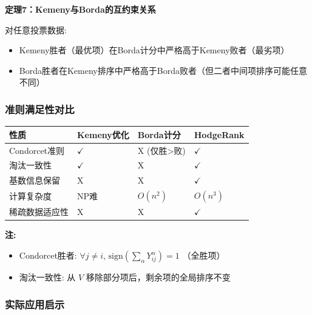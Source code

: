\documentclass[a4paper]{article}
\begin{document}
\textbf{定理7：Kemeny与Borda的互约束关系}

对任意投票数据:
\begin{itemize}
    \item Kemeny胜者（最优项）在Borda计分中严格高于Kemeny败者（最劣项）
    \item Borda胜者在Kemeny排序中严格高于Borda败者（但二者中间项排序可能任意不同）
\end{itemize}

\subsubsection*{准则满足性对比}

\begin{table}[h]
    \centering
    \begin{tabular}{m{4cm} m{2cm} m{2cm} m{2cm}}
        \textbf{性质} & \textbf{Kemeny优化} & \textbf{Borda计分} & \textbf{HodgeRank} \\
        \hline
        Condorcet准则 & $\checkmark$ & X (仅胜>败) & $\checkmark$ \\
        \hline
        淘汰一致性 & $\checkmark$ & X & $\checkmark$ \\
        \hline
        基数信息保留 & X & X & $\checkmark$ \\
        \hline
        计算复杂度 & NP难 & $O(n^2)$ & $O(n^3)$ \\
        \hline
        稀疏数据适应性 & X & X & $\checkmark$ \\
    \end{tabular}
\end{table}

\textbf{注:}
\begin{itemize}
    \item Condorcet胜者: $\forall j \neq i$, $\text{sign}(\sum_\alpha Y_{ij}^\alpha) = 1$ （全胜项）
    \item 淘汰一致性: 从 $V$ 移除部分项后，剩余项的全局排序不变
\end{itemize}

\subsubsection*{实际应用启示}
\end{document}
